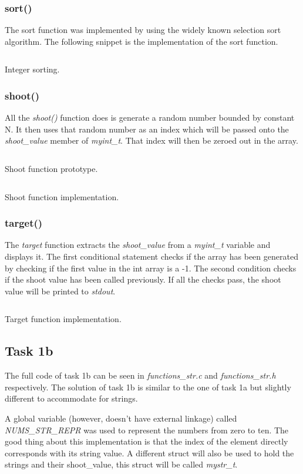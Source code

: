 \documentclass[a4paper, 12pt, titlepage]{article}
\newenvironment{code}{\captionsetup{type=listing}}{}
\newcommand{\sourcecode}[3]{
    \begin{code}
      \inputminted[linenos,numbersep=5pt,gobble=0,frame=lines,framesep=2mm,]{c}{#1}
        \caption{#2}
        \label{lst: #3}
    \end{code}
}
\begin{document}
\begin{onehalfspacing}
  \subsubsection{sort()}
  The sort function was implemented by using the widely known selection sort algorithm. The following snippet is the implementation of the sort function.
  \sourcecode{snippets/task1a_sort.c}{Integer sorting.}{task1a_sort}

  \clearpage

  \subsubsection{shoot()}
  All the \emph{shoot()} function does is generate a random number bounded by constant N. It then uses that random number as an index which will be passed onto the \emph{shoot\_value} member of \emph{myint\_t}. That index will then be zeroed out in the array.

  \sourcecode{snippets/int_shoot_header.c}{Shoot function prototype.}{task1a_shoot_prototype}
  \sourcecode{snippets/int_shoot_implementation.c}{Shoot function implementation.}{task1a_shoot}

  \subsubsection{target()}
  The \emph{target} function extracts the \emph{shoot\_value} from a \emph{myint\_t} variable and displays it. The first conditional statement checks if the array has been generated by checking if the first value in the int array is a -1. The second condition checks if the shoot value has been called previously. If all the checks pass, the shoot value will be printed to \emph{stdout}.
  \sourcecode{snippets/int_target.c}{Target function implementation.}{task1a_target}


  \subsection{Task 1b}
  The full code of task 1b can be seen in \emph{functions\_str.c} and \emph{functions\_str.h} respectively. The solution of task 1b is similar to the one of task 1a but slightly different to accommodate for strings.

  A global variable (however, doesn't have external linkage) called \emph{NUMS\_STR\_REPR} was used to represent the numbers from zero to ten. The good thing about this implementation is that the index of the element directly corresponds with its string value. A different struct will also be used to hold the strings and their shoot\_value, this struct will be called \emph{mystr\_t}.



\end{onehalfspacing}
\end{document}
